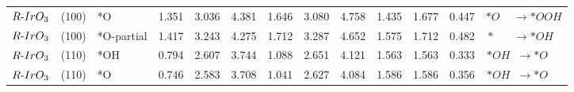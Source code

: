 \begin{tabular}{lllcccccccccc}
      $R{\text -}IrO_{3}$ &    (100) &          *O &            1.351 &           3.036 &             4.381 &            1.646 &           3.080 &             4.758 &                          1.435 &     1.677 &  0.447 &                         $*O \phantom{T} \phantom{T}  \rightarrow *OOH$ \\
      $R{\text -}IrO_{3}$ &    (100) &  *O-partial &            1.417 &           3.243 &             4.275 &            1.712 &           3.287 &             4.652 &                          1.575 &     1.712 &  0.482 &  $* \phantom{T} \phantom{T} \phantom{T}  \rightarrow *OH \phantom{T} $ \\
      $R{\text -}IrO_{3}$ &    (110) &         *OH &            0.794 &           2.607 &             3.744 &            1.088 &           2.651 &             4.121 &                          1.563 &     1.563 &  0.333 &              $*OH \phantom{T} \rightarrow *O \phantom{T} \phantom{T} $ \\
      $R{\text -}IrO_{3}$ &    (110) &          *O &            0.746 &           2.583 &             3.708 &            1.041 &           2.627 &             4.084 &                          1.586 &     1.586 &  0.356 &              $*OH \phantom{T} \rightarrow *O \phantom{T} \phantom{T} $ \\
\bottomrule
\end{tabular}

